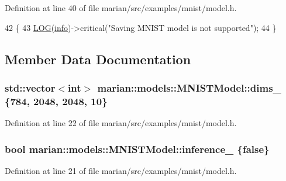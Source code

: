 Definition at line 40 of file marian/src/examples/mnist/model.\+h.


\begin{DoxyCode}
42                              \{
43     \hyperlink{amun_2common_2logging_8h_a8cad147aca8c526d3c8a03ae14d5c87d}{LOG}(\hyperlink{namespacefix__hard_a31eedbb056537bc1bef47ad5e40eaa68}{info})->critical(\textcolor{stringliteral}{"Saving MNIST model is not supported"});
44   \}
\end{DoxyCode}


\subsection{Member Data Documentation}
\subsubsection[{\texorpdfstring{dims\+\_\+}{dims_}}]{\setlength{\rightskip}{0pt plus 5cm}std\+::vector$<$int$>$ marian\+::models\+::\+M\+N\+I\+S\+T\+Model\+::dims\+\_\+ \{784, 2048, 2048, 10\}\hspace{0.3cm}{\ttfamily [private]}}\hypertarget{classmarian_1_1models_1_1MNISTModel_a2fff9a2599bb88f2d59ca9a2f062b491}{}\label{classmarian_1_1models_1_1MNISTModel_a2fff9a2599bb88f2d59ca9a2f062b491}


Definition at line 22 of file marian/src/examples/mnist/model.\+h.

\subsubsection[{\texorpdfstring{inference\+\_\+}{inference_}}]{\setlength{\rightskip}{0pt plus 5cm}bool marian\+::models\+::\+M\+N\+I\+S\+T\+Model\+::inference\+\_\+ \{false\}\hspace{0.3cm}{\ttfamily [private]}}\hypertarget{classmarian_1_1models_1_1MNISTModel_af7d608f3d2ebb6f2dfb1d37eaaa4152a}{}\label{classmarian_1_1models_1_1MNISTModel_af7d608f3d2ebb6f2dfb1d37eaaa4152a}


Definition at line 21 of file marian/src/examples/mnist/model.\+h.

